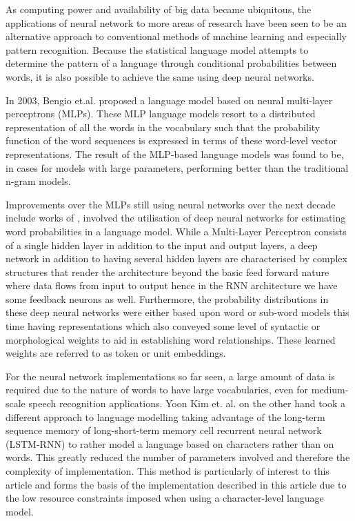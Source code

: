 \documentclass[a4paper]{article}
\begin{document}
As computing power and availability of big data became ubiquitous, the applications of neural network to more areas of research have been seen to be an alternative approach to conventional methods of machine learning and especially pattern recognition. Because the statistical language model attempts to determine the pattern of a language through conditional probabilities between words, it is also possible to achieve the same using deep neural networks. 

In 2003, Bengio et.al. \cite{bengio2003neural} proposed a language model based on neural multi-layer perceptrons (MLPs). These MLP language models resort to a distributed representation of all the words in the vocabulary such that the probability function of the word sequences is expressed in terms of these word-level vector representations. The result of the MLP-based language models was found to be, in cases for models with large parameters, performing better than the traditional n-gram models.

Improvements over the MLPs still using neural networks over the next decade include works of \cite{mikolov2011empirical,sutskever2014sequence,luong2013better}, involved the utilisation of deep neural networks for estimating word probabilities in a language model.  While a Multi-Layer Perceptron consists of a single hidden layer in addition to the input and output layers, a deep network in addition to having several hidden layers are characterised by complex structures that render the architecture beyond the basic feed forward nature where data flows from input to output hence in the RNN architecture we have some feedback neurons as well.  Furthermore, the probability distributions in these deep neural networks were either based upon word or sub-word models this time having representations which also conveyed some level of syntactic or morphological weights to aid in establishing word relationships.  These learned weights are referred to as token or unit embeddings.

For the neural network implementations so far seen, a large amount of data is required due to the nature of words to have large vocabularies, even for medium-scale speech recognition applications.  Yoon Kim et. al. \cite{kim2016character} on the other hand took a different approach to language modelling taking advantage of the long-term sequence memory of long-short-term memory cell recurrent neural network (LSTM-RNN) to rather model a language based on characters rather than on words.  This greatly reduced the number of parameters involved and therefore the complexity of implementation.  This method is particularly of interest to this article and forms the basis of the implementation described in this article due to the low resource constraints imposed when using a character-level language model.
\end{document}
